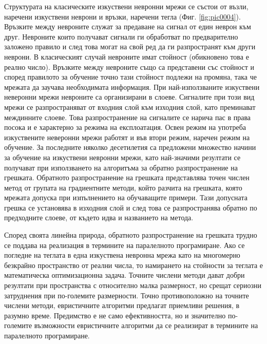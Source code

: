 \documentclass[book,14pt,oneside,openany]{memoir}
\begin{document}
Структурата на класическите изкуствени невронни мрежи се състои от възли, наречени изкуствени неврони и връзки, наречени тегла (Фиг. \ref{fig:pic0004}). Връзките между невроните служат за предаване на сигнал от един неврон към друг. Невроните които получават сигнали ги обработват по предварително заложено правило и след това могат на свой ред да ги разпространят към други неврони. В класическият случай невроните имат стойност (обикновено това е реално число). Връзките между невроните също са представени със стойност и според правилото за обучение точно тази стойност подлежи на промяна, така че мрежата да заучава необходимата информация. При най-използваните изкуствени неверонни мрежи невроните са организирани в слоеве. Сигналите при този вид мрежи се разпространяват от входния слой към изходния слой, като преминават междинните слоеве. Това разпространение на сигналите се нарича пас в права посока и е характерно за режима на експлоатация. Освен режим на употреба изкуствените неверонни мрежи работят и във втори режим, наречен режим на обучение. За последните няколко десетилетия са предложени множество начини за обучение на изкуствени невронни мрежи, като най-значими резултати се получават при използването на алгоритъма за обратно разпространение на грешката. Обратното разпространение на грешката представлява точен числен метод от групата на градиентните методи, който разчита на грешката, която мрежата допуска при изпълнението на обучаващите примери. Тази допусната грешка се установява в изходния слой и след това се разпространява обратно по предходните слоеве, от където идва и названието на метода. 

Според своята линейна природа, обратното разпространение на грешката трудно се поддава на реализация в термините на паралелното програмиране. Ако се погледне на теглата в една изкуствена невронна мрежа като на многомерно безкрайно пространство от реални числа, то намирането на стойности за теглата е математическа оптимизационна задача. Точните числени методи дават добри резултати при пространства с относително малка размерност, но срещат сериозни затруднения при по-големите размерности. Точно противоположно на точните числени методи, евристичните алгоритми предлагат приемливи решения, в разумно време. Предимство е не само ефективността, но и значително по-големите възможности евристичните алгоритми да се реализират в термините на паралелното програмиране. 
\end{document}

